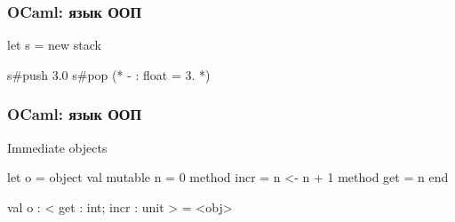 \begin{frame}[fragile]
  \frametitle{OCaml: язык ООП}

  \begin{ocamlcode}
let s = new stack

s#push 3.0
s#pop         (* - : float = 3. *)
  \end{ocamlcode}
  \vfill
\end{frame}

\begin{frame}[fragile]
  \frametitle{OCaml: язык ООП}

  \large Immediate objects
  \small
  \begin{ocamlcode}
let o =
  object
    val mutable n = 0
    method incr = n <- n + 1
    method get = n
  end

val o : < get : int; incr : unit > = <obj>
  \end{ocamlcode}
  \vfill
\end{frame}


